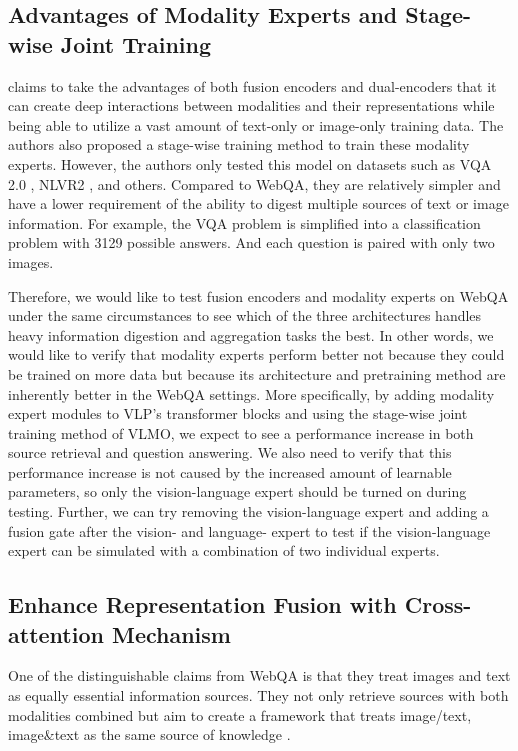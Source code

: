 \documentclass[nohyperref]{article}
\theoremstyle{plain}
\theoremstyle{definition}
\theoremstyle{remark}
\begin{document}
    \subsection{Advantages of Modality Experts and Stage-wise Joint Training}

    \cite{VLMO} claims to take the advantages of both fusion encoders and dual-encoders that it can create deep
    interactions between modalities and their representations while being able to utilize a vast amount of text-only
    or image-only training data.
    The authors also proposed a stage-wise training method to train these modality experts.
    However, the authors only tested this model on datasets such as VQA 2.0 \cite{antol2015vqa}, NLVR2 \cite{nlvr2}, and others.
    Compared to WebQA, they are relatively simpler and have a lower requirement of the ability to digest multiple
    sources of text or image information.
    For example, the VQA problem is simplified into a classification problem with 3129 possible answers. And each question is paired with only two images.

    Therefore, we would like to test fusion encoders and modality experts on WebQA under the same
    circumstances to see which of the three architectures handles heavy information digestion and aggregation tasks the best.
    In other words, we would like to verify that modality experts perform better not because they could be trained on
    more data but because its architecture and pretraining method are inherently better in the WebQA settings.
    More specifically, by adding modality expert modules to VLP's transformer blocks and using the stage-wise joint
    training method of VLMO, we expect to see a performance increase in both source retrieval and question answering.
    We also need to verify that this performance increase is not caused by the increased amount of learnable parameters,
    so only the vision-language expert should be turned on during testing.
    Further, we can try removing the vision-language expert and adding a fusion gate after the vision- and
    language- expert to test if the vision-language expert can be simulated with a combination of two individual experts.

    \subsection{Enhance Representation Fusion with Cross-attention Mechanism}
    One of the distinguishable claims from WebQA is that they treat images and text as equally essential information sources. They not only retrieve sources with both modalities combined but aim to create a framework that treats image/text, image\&text as the same source of knowledge \cite{webqa}.
\end{document}
